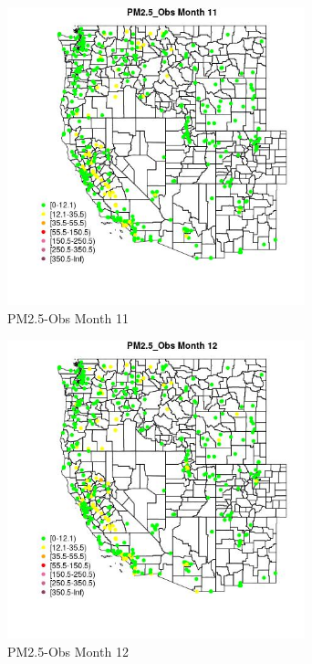 \begin{figure} 
\centering  
\includegraphics[width=0.77\textwidth]{Code_Outputs/ML_input_report_ML_input_PM25_Step5_part_d_de_duplicated_aves_ML_input_MapObsMo11PM25_Obs.jpg} 
\caption{\label{fig:ML_input_report_ML_input_PM25_Step5_part_d_de_duplicated_aves_ML_inputMapObsMo11PM25_Obs}PM2.5-Obs Month 11} 
\end{figure} 
 

\begin{figure} 
\centering  
\includegraphics[width=0.77\textwidth]{Code_Outputs/ML_input_report_ML_input_PM25_Step5_part_d_de_duplicated_aves_ML_input_MapObsMo12PM25_Obs.jpg} 
\caption{\label{fig:ML_input_report_ML_input_PM25_Step5_part_d_de_duplicated_aves_ML_inputMapObsMo12PM25_Obs}PM2.5-Obs Month 12} 
\end{figure} 
 

